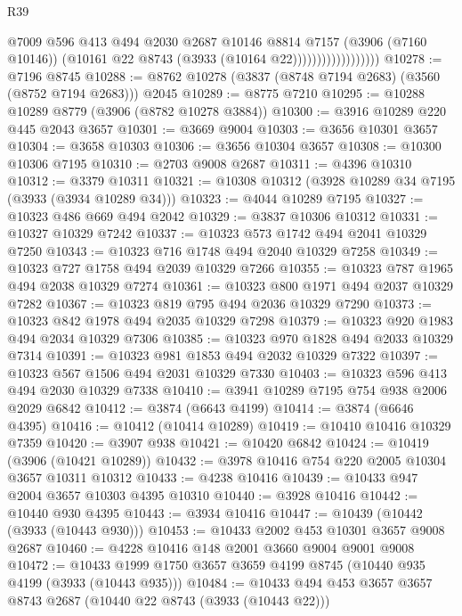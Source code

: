 \begin{lexlean}{R39}
\begin{coremodule}
                                  @7009
                                  @596
                                  @413
                                  @494
                                  @2030
                                  @2687
                                  @10146
                                  @8814
                                  @7157
                                  (@3906 (@7160 @10146))
                                  (@10161 @22 @8743 (@3933 (@10164 @22))))))))))))))))))
@10278 := @7196 @8745
@10288 := @8762 @10278 (@3837 (@8748 @7194 @2683) (@3560 (@8752 @7194 @2683))) @2045
@10289 := @8775 @7210
@10295 := @10288 @10289 @8779 (@3906 (@8782 @10278 @3884))
@10300 := @3916 @10289 @220 @445 @2043 @3657
@10301 := @3669 @9004
@10303 := @3656 @10301 @3657
@10304 := @3658 @10303
@10306 := @3656 @10304 @3657
@10308 := @10300 @10306 @7195
@10310 := @2703 @9008 @2687
@10311 := @4396 @10310
@10312 := @3379 @10311
@10321 := @10308 @10312 (@3928 @10289 @34 @7195 (@3933 (@3934 @10289 @34)))
@10323 := @4044 @10289 @7195
@10327 := @10323 @486 @669 @494 @2042
@10329 := @3837 @10306 @10312
@10331 := @10327 @10329 @7242
@10337 := @10323 @573 @1742 @494 @2041 @10329 @7250
@10343 := @10323 @716 @1748 @494 @2040 @10329 @7258
@10349 := @10323 @727 @1758 @494 @2039 @10329 @7266
@10355 := @10323 @787 @1965 @494 @2038 @10329 @7274
@10361 := @10323 @800 @1971 @494 @2037 @10329 @7282
@10367 := @10323 @819 @795 @494 @2036 @10329 @7290
@10373 := @10323 @842 @1978 @494 @2035 @10329 @7298
@10379 := @10323 @920 @1983 @494 @2034 @10329 @7306
@10385 := @10323 @970 @1828 @494 @2033 @10329 @7314
@10391 := @10323 @981 @1853 @494 @2032 @10329 @7322
@10397 := @10323 @567 @1506 @494 @2031 @10329 @7330
@10403 := @10323 @596 @413 @494 @2030 @10329 @7338
@10410 := @3941 @10289 @7195 @754 @938 @2006 @2029 @6842
@10412 := @3874 (@6643 @4199)
@10414 := @3874 (@6646 @4395)
@10416 := @10412 (@10414 @10289)
@10419 := @10410 @10416 @10329 @7359
@10420 := @3907 @938
@10421 := @10420 @6842
@10424 := @10419 (@3906 (@10421 @10289))
@10432 := @3978 @10416 @754 @220 @2005 @10304 @3657 @10311 @10312
@10433 := @4238 @10416
@10439 := @10433 @947 @2004 @3657 @10303 @4395 @10310
@10440 := @3928 @10416
@10442 := @10440 @930 @4395
@10443 := @3934 @10416
@10447 := @10439 (@10442 (@3933 (@10443 @930)))
@10453 := @10433 @2002 @453 @10301 @3657 @9008 @2687
@10460 := @4228 @10416 @148 @2001 @3660 @9004 @9001 @9008
@10472 := @10433 @1999 @1750 @3657 @3659 @4199 @8745 (@10440 @935 @4199 (@3933 (@10443 @935)))
@10484 := @10433 @494 @453 @3657 @3657 @8743 @2687 (@10440 @22 @8743 (@3933 (@10443 @22)))

\end{coremodule}
\end{lexlean}
